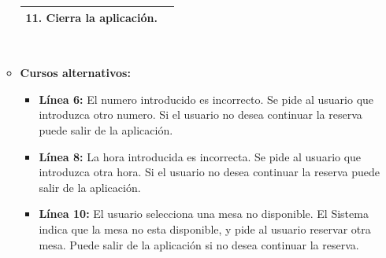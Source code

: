 \documentclass[spanish,a4paper,12pt]{report}		%
\begin{document}
\begin{itemize}
\begin{itemize}
\begin{tabular}{|p{6cm}||p{6cm}|}
				\textbf{11.} Cierra la aplicación. & \textbf{} \\ \hline
			\end{tabular}
			\\
			\item \textbf{Cursos alternativos:} 
			\begin{itemize}
			\item  \textbf{Línea 6:} El numero introducido es incorrecto. Se pide al usuario que introduzca otro numero. Si el usuario no desea continuar la reserva puede salir de la aplicación.
			\item  \textbf{Línea 8:} La hora introducida es incorrecta. Se pide al usuario que introduzca otra hora. Si el usuario no desea continuar la reserva puede salir de la aplicación.
			\item  \textbf{Línea 10:} El usuario selecciona una mesa no disponible. El Sistema indica que la mesa no esta disponible, y pide al usuario reservar otra mesa. Puede salir de la aplicación si no desea continuar la reserva.
			\end {itemize}
		\end {itemize}
		


\end{itemize}
\end{document}

